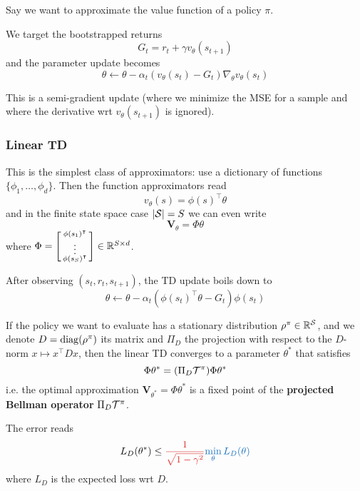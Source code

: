 \documentclass[../course-notes.tex]{subfiles}
\begin{document}
Say we want to approximate the value function of a policy $\pi$.

We target the bootstrapped returns
\[
	G_t = r_t + \gamma v_{\theta}(s_{t+1})
\]
and the parameter update becomes
\begin{equation}
	\theta \leftarrow \theta - \alpha_t (v_{\theta}(s_t)-G_t) \nabla_\theta v_\theta(s_t)
\end{equation}

This is a semi-gradient update (where we minimize the MSE for a sample and where the derivative wrt $v_\theta(s_{t+1})$ is ignored).

\subsubsection{Linear TD}

This is the simplest class of approximators: use a dictionary of functions $\{\phi_1, \ldots, \phi_d\}$. Then the function approximators read
\[
	v_\theta(s) = \phi(s)^\intercal \theta
\]
and in the finite state space case $|\mathcal{S}| = S$ we can even write
\[
	\mathbf{V}_\theta = \Phi\theta
\]
where $\Phi = \begin{bsmallmatrix}\phi(s_1)^\intercal \\ \vdots \\ \phi(s_S)^\intercal \end{bsmallmatrix} \in\mathbb{R}^{S\times d}$.

After observing $(s_t,r_t,s_{t+1})$, the TD update boils down to
\begin{equation}\label{eq:LinearTDupdate}
	\theta \leftarrow \theta - \alpha_t (\phi(s_t)^\intercal \theta - G_t)\phi(s_t)
\end{equation}


\begin{prop}
If the policy we want to evaluate has a stationary distribution $\rho^\pi \in \mathbb{R}^{\mathcal{S}}$, and we denote $D = \operatorname{\mathrm{diag}}(\rho^\pi)$ its matrix and $\Pi_D$ the projection with respect to the $D$-norm $x\mapsto x^\intercal D x$, then the linear TD converges to a parameter $\theta^*$ that satisfies
\begin{equation}
	\Phi\theta^* =
	(\Pi_D \mathcal{T}^\pi) \Phi\theta^*
\end{equation}
i.e. the optimal approximation $\mathbf{V}_{\theta^*} = \Phi\theta^*$ is a fixed point of the \textbf{\bluefont projected Bellman operator} $\Pi_D\mathcal{T}^\pi$.

The error reads
\begin{equation}
		L_D(\theta^*) \leq {\redfont \frac{1}{\sqrt{1-\gamma^2}}} {\bluefont \min_\theta L_D(\theta)}
\end{equation}
where $L_D$ is the expected loss wrt $D$.
\end{prop}
\end{document}
